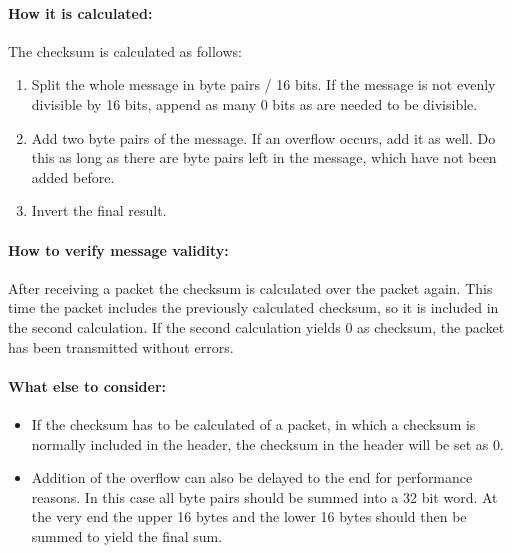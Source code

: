 \paragraph{How it is calculated:}
The checksum is calculated as follows:
\begin{enumerate}
  \item Split the whole message in byte pairs / 16 bits. If the message is not evenly divisible by 16 bits, append as many 0 bits as are needed to be divisible.
  \item Add two byte pairs of the message. If an overflow occurs, add it as well. Do this as long as there are byte pairs left in the message, which have not been added before.
  \item Invert the final result.
\end{enumerate}

\paragraph{How to verify message validity:}
After receiving a packet the checksum is calculated over the packet again. This time the packet includes the previously calculated checksum, so it is included in the second calculation. If the second calculation yields 0 as checksum, the packet has been transmitted without errors.

\paragraph{What else to consider:}
\begin{itemize}
  \item If the checksum has to be calculated of a packet, in which a checksum is normally included in the header, the checksum in the header will be set as 0.
  \item Addition of the overflow can also be delayed to the end for performance reasons. In this case all byte pairs should be summed into a 32 bit word. At the very end the upper 16 bytes and the lower 16 bytes should then be summed to yield the final sum.
\end{itemize}

